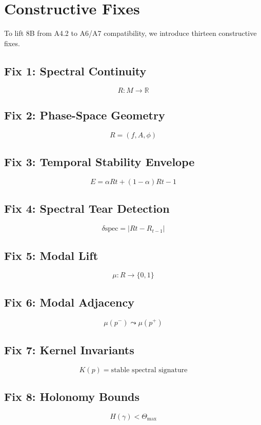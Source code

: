 \documentclass[11pt]{article}
\begin{document}
\section{Constructive Fixes}

To lift 8B from A4.2 to A6/A7 compatibility, we introduce thirteen
constructive fixes.

\subsection{Fix 1: Spectral Continuity}
\[
R : M \to \mathbb{R}
\]

\subsection{Fix 2: Phase-Space Geometry}
\[
R = (f, A, \phi)
\]

\subsection{Fix 3: Temporal Stability Envelope}
\[
E = \alpha Rt + (1-\alpha) R{t-1}
\]

\subsection{Fix 4: Spectral Tear Detection}
\[
\delta{\mathrm{spec}} = |Rt - R_{t-1}|
\]

\subsection{Fix 5: Modal Lift}
\[
\mu : R \to \{0,1\}
\]

\subsection{Fix 6: Modal Adjacency}
\[
\mu(p^-) \leadsto \mu(p^+)
\]

\subsection{Fix 7: Kernel Invariants}
\[
K(p) = \text{stable spectral signature}
\]

\subsection{Fix 8: Holonomy Bounds}
\[
H(\gamma) < \Theta_{\max}
\]
\end{document}
